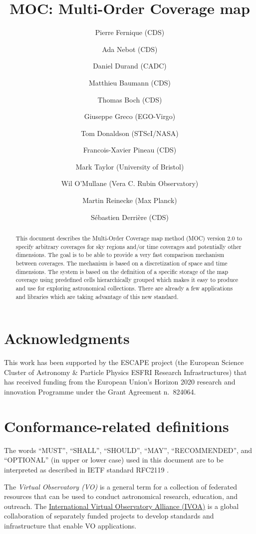 \documentclass[11pt,a4paper]{ivoa}
\title{MOC: Multi-Order Coverage map}
\author[http://www.ivoa.net/twiki/bin/view/IVOA/PierreFernique]{Pierre Fernique (CDS)}
\author[http://www.ivoa.net/twiki/bin/view/IVOA/AdaNebot]{Ada Nebot (CDS)}
\author[http://www.ivoa.net/twiki/bin/view/IVOA/DanielDurand]{Daniel Durand (CADC)} \author{Matthieu Baumann (CDS)}
\author[http://www.ivoa.net/twiki/bin/view/IVOA/ThomasBoch]{Thomas Boch (CDS)} \author{Giuseppe Greco (EGO-Virgo)}
\author[http://www.ivoa.net/twiki/bin/view/IVOA/TomDonaldson]{Tom Donaldson (STScI/NASA)}
\author{Francois-Xavier Pineau (CDS)}
\author[http://www.ivoa.net/twiki/bin/view/IVOA/MarkTaylor]{Mark Taylor (University of Bristol)}
\author{Wil O'Mullane (Vera C. Rubin Observatory)}
\author{Martin Reinecke (Max Planck)}
\author{S\'{e}bastien Derri\`{e}re (CDS)}
\begin{document}
\begin{abstract}
This document describes the Multi-Order Coverage map method (MOC)
version 2.0 to specify arbitrary coverages for sky regions and/or time
coverages and potentially other dimensions. The goal is to be able to
provide a very fast comparison mechanism between coverages. The
mechanism is based on a discretization of space and time
dimensions. The system is based on the definition of a specific storage
of the map coverage using predefined cells hierarchically grouped
which makes it easy to produce and use for exploring astronomical
collections. There are already a few applications and libraries which
are taking advantage of this new standard. 
\end{abstract}

\listoffigures
\listoftables  


\section*{Acknowledgments}
This work has been supported by the ESCAPE project (the European
Science Cluster of Astronomy \& Particle Physics ESFRI Research
Infrastructures) that has received funding from the European Union's
Horizon 2020 research and innovation Programme under the Grant
Agreement n.\ 824064.

\section*{Conformance-related definitions}
The words ``MUST'', ``SHALL'', ``SHOULD'', ``MAY'', ``RECOMMENDED'',
and ``OPTIONAL'' (in upper or lower case) used in this document are to
be interpreted as described in IETF standard RFC2119
\citep{std:RFC2119}.

The \emph{Virtual Observatory (VO)} is a general term for a collection
of federated resources that can be used to conduct astronomical
research, education, and outreach.  The
\href{http://www.ivoa.net}{International Virtual Observatory Alliance
  (IVOA)} is a global collaboration of separately funded projects to
develop standards and infrastructure that enable VO applications.
\end{document}
